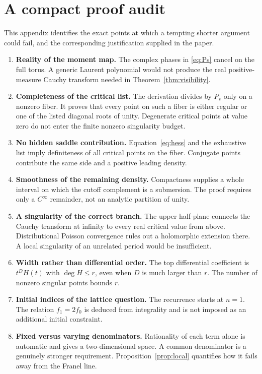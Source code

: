 \documentclass[11pt,a4paper]{article}
\theoremstyle{definition}\newtheorem{definition}[theorem]{Definition}
\theoremstyle{remark}\newtheorem{remark}[theorem]{Remark}
\begin{document}
\section{A compact proof audit}
This appendix identifies the exact points at which a tempting shorter argument
could fail, and the corresponding justification supplied in the paper.
\begin{enumerate}[label=\arabic*.]
\item \textbf{Reality of the moment map.} The complex phases in
\eqref{eq:Ps} cancel on the full torus. A generic Laurent polynomial would not
produce the real positive-measure Cauchy transform needed in
Theorem~\ref{thm:visibility}.
\item \textbf{Completeness of the critical list.} The derivation divides by
$P_s$ only on a nonzero fiber. It proves that every point on such a fiber is
either regular or one of the listed diagonal roots of unity. Degenerate
critical points at value zero do not enter the finite nonzero singularity
budget.
\item \textbf{No hidden saddle contribution.} Equation~\eqref{eq:hess} and
the exhaustive list imply definiteness of all critical points on the fiber.
Conjugate points contribute the same side and a positive leading density.
\item \textbf{Smoothness of the remaining density.} Compactness supplies a
whole interval on which the cutoff complement is a submersion. The proof
requires only a $C^\infty$ remainder, not an analytic partition of unity.
\item \textbf{A singularity of the correct branch.} The upper half-plane
connects the Cauchy transform at infinity to every real critical value from
above. Distributional Poisson convergence rules out a holomorphic extension
there. A local singularity of an unrelated period would be insufficient.
\item \textbf{Width rather than differential order.} The top differential
coefficient is $t^D H(t)$ with $\deg H\le r$, even when $D$ is much larger
than $r$. The number of nonzero singular points bounds $r$.
\item \textbf{Initial indices of the lattice question.} The recurrence starts
at $n=1$. The relation $f_1=2f_0$ is deduced from integrality and is not imposed
as an additional initial constraint.
\item \textbf{Fixed versus varying denominators.} Rationality of each term
alone is automatic and gives a two-dimensional space. A common denominator is
a genuinely stronger requirement. Proposition~\ref{prop:local} quantifies how
it fails away from the Franel line.
\end{enumerate}
\end{document}
